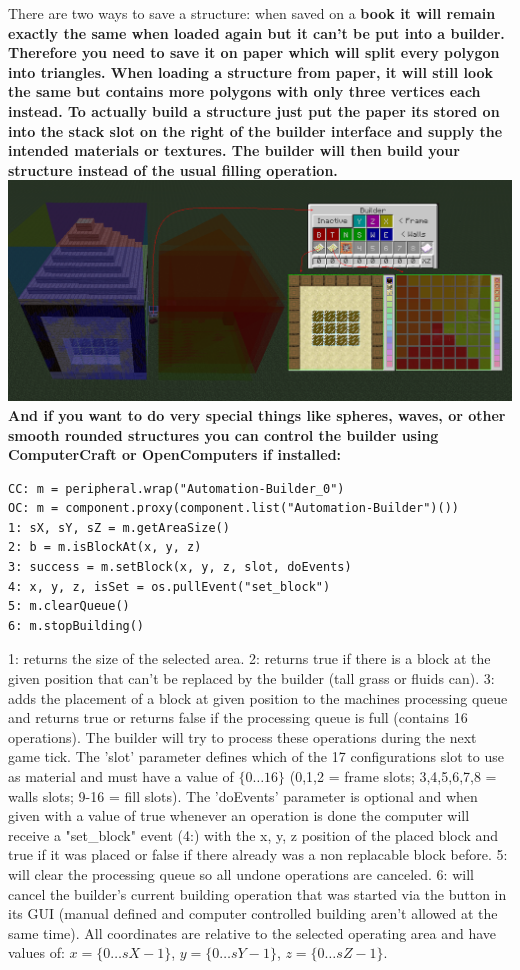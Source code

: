 \documentclass[11pt]{article} %
\begin{document}
There are two ways to save a structure: when saved on a \bf book \rm it will remain exactly the same when loaded again but it can't be put into a builder. Therefore you need to save it on \bf paper \rm which will split every polygon into triangles. When loading a structure from paper, it will still look the same but contains more polygons with only three vertices each instead. To actually build a structure just put the paper its stored on into the stack slot on the right of the builder interface and supply the intended materials or textures. The builder will then build your structure instead of the usual filling operation.\\
\includegraphics[width = \textwidth]{vertexEx}\\

And if you want to do very special things like spheres, waves, or other smooth rounded structures you can  control the builder using ComputerCraft or OpenComputers if installed:
\begin{lstlisting}
CC: m = peripheral.wrap("Automation-Builder_0")
OC: m = component.proxy(component.list("Automation-Builder")())
1: sX, sY, sZ = m.getAreaSize() 
2: b = m.isBlockAt(x, y, z) 
3: success = m.setBlock(x, y, z, slot, doEvents)
4: x, y, z, isSet = os.pullEvent("set_block")
5: m.clearQueue()
6: m.stopBuilding()
\end{lstlisting}
1: returns the size of the selected area. 2: returns true if there is a block at the given position that can't be replaced by the builder (tall grass or fluids can). 3: adds the placement of a block at given position to the machines processing queue and returns true or returns false if the processing queue is full (contains 16 operations). The builder will try to process these operations during the next game tick. The 'slot' parameter defines which of the 17 configurations slot to use as material and must have a value of $\{ 0 \dots 16 \}$ (0,1,2 = frame slots; 3,4,5,6,7,8 = walls slots; 9-16 = fill slots). The 'doEvents' parameter is optional and when given with a value of true whenever an operation is done the computer will receive a "set\_block" event (4:) with the x, y, z position of the placed block and true if it was placed or false if there already was a non replacable block before. 5: will clear the processing queue so all undone operations are canceled. 6: will cancel the builder's current building operation that was started via the button in its GUI (manual defined and computer controlled building aren't allowed at the same time). All coordinates are relative to the selected operating area and have values of: $x=\{0 \dots sX-1\}$, $y=\{0 \dots sY - 1\}$, $z=\{0 \dots sZ - 1\}$.
\end{document}
